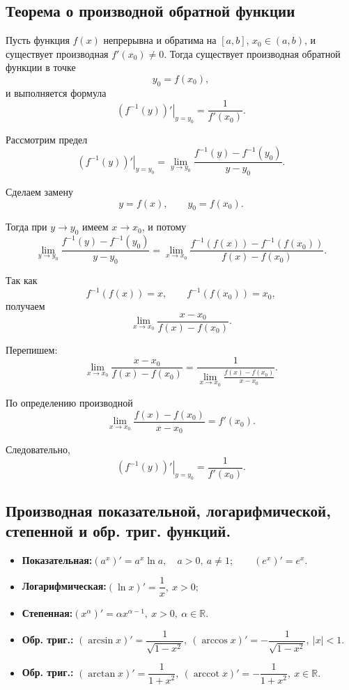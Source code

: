 \subsection{Теорема о производной обратной функции}

\begin{theorem}
Пусть функция $f(x)$ непрерывна и обратима на $[a,b]$, 
$x_0 \in (a,b)$, и существует производная $f'(x_0)\neq 0$.
Тогда существует производная обратной функции в точке
\[
y_0 = f(x_0),
\]
и выполняется формула
\[
\left.(f^{-1}(y))'\right|_{y=y_0} = \frac{1}{f'(x_0)}.
\]
\end{theorem}

\begin{Proof}
Рассмотрим предел
\[
\left.(f^{-1}(y))'\right|_{y=y_0}
=
\lim_{y\to y_0}\frac{f^{-1}(y)-f^{-1}(y_0)}{y-y_0}.
\]

Сделаем замену
\[
y = f(x), \qquad y_0 = f(x_0).
\]

Тогда при $y\to y_0$ имеем $x\to x_0$, и потому
\[
\lim_{y\to y_0}\frac{f^{-1}(y)-f^{-1}(y_0)}{y-y_0}
=
\lim_{x\to x_0}\frac{f^{-1}(f(x)) - f^{-1}(f(x_0))}{f(x)-f(x_0)}.
\]

Так как
\[
f^{-1}(f(x)) = x, \qquad f^{-1}(f(x_0)) = x_0,
\]
получаем
\[
\lim_{x\to x_0}\frac{x-x_0}{f(x)-f(x_0)}.
\]

Перепишем:
\[
\lim_{x\to x_0}\frac{x-x_0}{f(x)-f(x_0)}
=
\frac{1}{\displaystyle \lim_{x\to x_0}\frac{f(x)-f(x_0)}{x-x_0}}.
\]

По определению производной
\[
\lim_{x\to x_0}\frac{f(x)-f(x_0)}{x-x_0} = f'(x_0).
\]

Следовательно,
\[
\left.(f^{-1}(y))'\right|_{y=y_0}
=
\frac{1}{f'(x_0)}.
\]
\end{Proof}



\subsection{Производная показательной, логарифмической, степенной и обр. триг. функций.}
\begin{theorem}
\begin{itemize}
\item \textbf{Показательная:}\quad $(a^x)'=a^x\ln a,\quad a>0,\ a\ne 1;\qquad (e^x)'=e^x.$
\item \textbf{Логарифмическая:}\quad $(\ln x)'=\dfrac1x,\ x>0;\qquad $
\item \textbf{Степенная:}\quad $(x^\alpha)'=\alpha x^{\alpha-1},\ x>0,\ \alpha\in\mathbb{R}.$
\item \textbf{Обр. триг.:}\quad
$(\arcsin x)'=\dfrac1{\sqrt{1-x^2}},\ 
(\arccos x)'=-\dfrac1{\sqrt{1-x^2}},\ |x|<1.$
\item \textbf{Обр. триг.:}\quad
$(\arctan x)'=\dfrac1{1+x^2},\ 
(\operatorname{arccot} x)'=-\dfrac1{1+x^2},\ x\in\mathbb{R}.$
\end{itemize}
\end{theorem}

